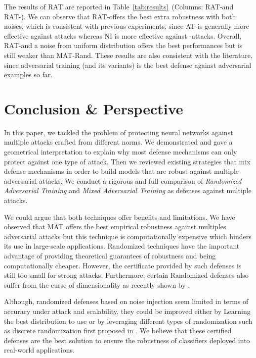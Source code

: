 The results of RAT are reported in Table~\ref{tab:results}~(Columns: RAT-\linf and RAT-\ltwo).
We can observe that RAT-\linf offers the best extra robustness with both noises, which is consistent with previous experiments, since AT is generally more effective against \linf attacks whereas NI is more effective against \ltwo-attacks. Overall, RAT-\linf and a noise from uniform distribution offers the best performances but is still weaker than MAT-Rand.
These results are also consistent with the literature, since adversarial training (and its variants) is the best defense against adversarial examples so far.


\section{Conclusion \& Perspective}
In this paper, we tackled the problem of protecting neural networks against multiple attacks crafted from different norms. We demonstrated and gave a geometrical interpretation to explain why most defense mechanisms can only protect against one type of attack. Then we reviewed existing strategies that mix defense mechanisms in order to build models that are robust against multiple adversarial attacks. We conduct a rigorous and full comparison of {\em Randomized Adversarial Training} and {\em Mixed Adversarial Training} as defenses against multiple attacks. 

We could argue that both techniques offer benefits and limitations. We have observed that MAT offers the best empirical robustness against multiples adversarial attacks but this technique is computationally expensive which hinders its use in large-scale applications. Randomized techniques have the important advantage of providing theoretical guarantees of robustness and being computationally cheaper. However, the certificate provided by such defenses is still too small for strong attacks. Furthermore, certain Randomized defenses also suffer from the curse of dimensionality as recently shown by \cite{kumar2020curse}. 

Although, randomized defenses based on noise injection seem limited in terms of accuracy under attack and scalability, they could be improved either by Learning the best distribution to use or by leveraging different types of randomization such as discrete randomization first proposed in \cite{pinot2020randomization}. We believe that these certified defenses are the best solution to ensure the robustness of classifiers deployed into real-world applications. 



